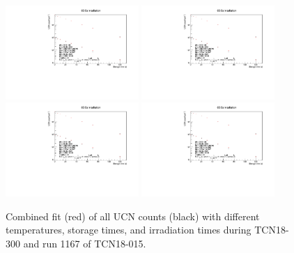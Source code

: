 \documentclass[10pt,letterpaper]{article}
\begin{document}
\begin{figure}
\includegraphics[width=0.45\textwidth,page=7]{../storagelifetime/combinedfit.pdf}
\includegraphics[width=0.45\textwidth,page=8]{../storagelifetime/combinedfit.pdf}
\includegraphics[width=0.45\textwidth,page=9]{../storagelifetime/combinedfit.pdf}
\includegraphics[width=0.45\textwidth,page=1]{../storagelifetime/combinedfit.pdf}
\caption{Combined fit (red) of all UCN counts (black) with different temperatures, storage times, and irradiation times during TCN18-300 and run 1167 of TCN18-015.}
\label{fig:combinedfit}
\end{figure}
\end{document}
